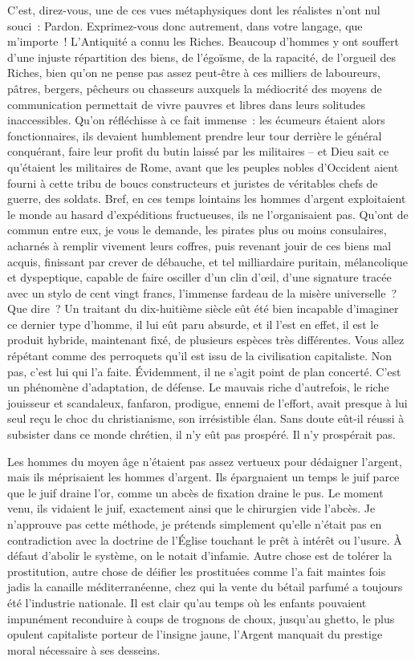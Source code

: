 \documentclass[french,twoside]{book} %
\begin{document}
C’est, direz-vous, une de ces vues métaphysiques dont les réalistes n’ont nul souci : Pardon. Exprimez-vous donc autrement, dans votre langage, que m’importe ! L’Antiquité a connu les Riches. Beaucoup d’hommes y ont souffert d’une injuste répartition des biens, de l’égoïsme, de la rapacité, de l’orgueil des Riches, bien qu’on ne pense pas assez peut-être à ces milliers de laboureurs, pâtres, bergers, pêcheurs ou chasseurs auxquels la médiocrité des moyens de communication permettait de vivre pauvres et libres dans leurs solitudes inaccessibles. Qu’on réfléchisse à ce fait immense : les écumeurs étaient alors fonctionnaires, ils devaient humblement prendre leur tour derrière le général conquérant, faire leur profit du butin laissé par les militaires – et Dieu sait ce qu’étaient les militaires de Rome, avant que les peuples nobles d’Occident aient fourni à cette tribu de boucs constructeurs et juristes de véritables chefs de guerre, des soldats. Bref, en ces temps lointains les hommes d’argent exploitaient le monde au hasard d’expéditions fructueuses, ils ne l’organisaient pas. Qu’ont de commun entre eux, je vous le demande, les pirates plus ou moins consulaires, acharnés à remplir vivement leurs coffres, puis revenant jouir de ces biens mal acquis, finissant par crever de débauche, et tel milliardaire puritain, mélancolique et dyspeptique, capable de faire osciller d’un clin d’œil, d’une signature tracée avec un stylo de cent vingt francs, l’immense fardeau de la misère universelle ? Que dire ? Un traitant du dix-huitième siècle eût été bien incapable d’imaginer ce dernier type d’homme, il lui eût paru absurde, et il l’est en effet, il est le produit hybride, maintenant fixé, de plusieurs espèces très différentes. Vous allez répétant comme des perroquets qu’il est issu de la civilisation capitaliste. Non pas, c’est lui qui l’a faite. Évidemment, il ne s’agit point de plan concerté. C’est un phénomène d’adaptation, de défense. Le mauvais riche d’autrefois, le riche jouisseur et scandaleux, fanfaron, prodigue, ennemi de l’effort, avait presque à lui seul reçu le choc du christianisme, son irrésistible élan. Sans doute eût-il réussi à subsister dans ce monde chrétien, il n’y eût pas prospéré. Il n’y prospérait pas.\par
Les hommes du moyen âge n’étaient pas assez vertueux pour dédaigner l’argent, mais ils méprisaient les hommes d’argent. Ils épargnaient un temps le juif parce que le juif draine l’or, comme un abcès de fixation draine le pus. Le moment venu, ils vidaient le juif, exactement ainsi que le chirurgien vide l’abcès. Je n’approuve pas cette méthode, je prétends simplement qu’elle n’était pas en contradiction avec la doctrine de l’Église touchant le prêt à intérêt ou l’usure. À défaut d’abolir le système, on le notait d’infamie. Autre chose est de tolérer la prostitution, autre chose de déifier les prostituées comme l’a fait maintes fois jadis la canaille méditerranéenne, chez qui la vente du bétail parfumé a toujours été l’industrie nationale. Il est clair qu’au temps où les enfants pouvaient impunément reconduire à coups de trognons de choux, jusqu’au ghetto, le plus opulent capitaliste porteur de l’insigne jaune, l’Argent manquait du prestige moral nécessaire à ses desseins.\par
\end{document}
